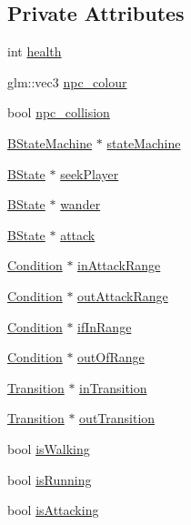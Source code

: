 \subsection*{Private Attributes}
\begin{DoxyCompactItemize}
\item 
int \hyperlink{classNPC__Actor_ab86bda3924c077b5e162a55ab0f755e4}{health}
\item 
glm\+::vec3 \hyperlink{classNPC__Actor_a232164230fc00e76adb5c73e99c9d25b}{npc\+\_\+colour}
\item 
bool \hyperlink{classNPC__Actor_aed111eb54650325f6b573d6c7eead724}{npc\+\_\+collision}
\item 
\hyperlink{classBStateMachine}{B\+State\+Machine} $\ast$ \hyperlink{classNPC__Actor_a893e34f05e775fb908431ea3ccd050c0}{state\+Machine}
\item 
\hyperlink{classBState}{B\+State} $\ast$ \hyperlink{classNPC__Actor_abda022e63f59e763f64ef227889fe557}{seek\+Player}
\item 
\hyperlink{classBState}{B\+State} $\ast$ \hyperlink{classNPC__Actor_ab1bffb4fa8bff0259a4472877282a1dd}{wander}
\item 
\hyperlink{classBState}{B\+State} $\ast$ \hyperlink{classNPC__Actor_a9af988fb1e657f9d8aed581cb6ad4b92}{attack}
\item 
\hyperlink{classCondition}{Condition} $\ast$ \hyperlink{classNPC__Actor_a86543ff81852572e2600abd0681148fc}{in\+Attack\+Range}
\item 
\hyperlink{classCondition}{Condition} $\ast$ \hyperlink{classNPC__Actor_a770a1305cf4cb10c03f414e9634fb1b5}{out\+Attack\+Range}
\item 
\hyperlink{classCondition}{Condition} $\ast$ \hyperlink{classNPC__Actor_ae81ad1d14e52ada49257eedbbdbb83df}{if\+In\+Range}
\item 
\hyperlink{classCondition}{Condition} $\ast$ \hyperlink{classNPC__Actor_aeff8e47fde9f5edd76bc54a76b5e07ca}{out\+Of\+Range}
\item 
\hyperlink{classTransition}{Transition} $\ast$ \hyperlink{classNPC__Actor_ac63373fb322218c56cfc46ee6882001f}{in\+Transition}
\item 
\hyperlink{classTransition}{Transition} $\ast$ \hyperlink{classNPC__Actor_af67abbbb96dc9f7abf9f9d3db665d9e7}{out\+Transition}
\item 
bool \hyperlink{classNPC__Actor_af7ae5ac70a3d6f2e34ede9090e9ed613}{is\+Walking}
\item 
bool \hyperlink{classNPC__Actor_a9be686994f2d2d8543cf8c05129ad8fc}{is\+Running}
\item 
bool \hyperlink{classNPC__Actor_ac4a60d0f75b7de3b813c6282c1d38aa2}{is\+Attacking}
\end{DoxyCompactItemize}

